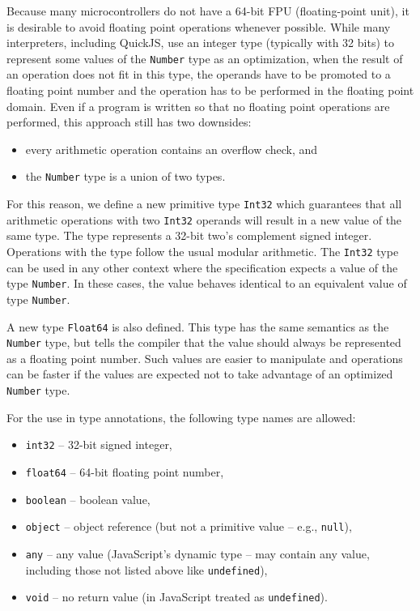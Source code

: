 Because many microcontrollers do not have a 64-bit FPU (floating-point unit), it is desirable to avoid floating point operations whenever possible. While many interpreters, including QuickJS, use an integer type (typically with 32 bits) to represent some values of the \texttt{Number} type as an optimization, when the result of an operation does not fit in this type, the operands have to be promoted to a floating point number and the operation has to be performed in the floating point domain. Even if a program is written so that no floating point operations are performed, this approach still has two downsides:
\begin{itemize}
    \item every arithmetic operation contains an overflow check, and
    \item the \texttt{Number} type is a union of two types.
\end{itemize}

For this reason, we define a new primitive type \texttt{Int32} which guarantees that all arithmetic operations with two \texttt{Int32} operands will result in a new value of the same type. The type represents a 32-bit two's complement signed integer. Operations with the type follow the usual modular arithmetic. The \texttt{Int32} type can be used in any other context where the specification expects a value of the type \texttt{Number}. In these cases, the value behaves identical to an equivalent value of type \texttt{Number}.

A new type \texttt{Float64} is also defined. This type has the same semantics as the \texttt{Number} type, but tells the compiler that the value should always be represented as a floating point number. Such values are easier to manipulate and operations can be faster if the values are expected not to take advantage of an optimized \texttt{Number} type.

For the use in type annotations, the following type names are allowed:
\begin{itemize}
    \item \texttt{int32} -- 32-bit signed integer,
    \item \texttt{float64} -- 64-bit floating point number,
    \item \texttt{boolean} -- boolean value,
    \item \texttt{object} -- object reference (but not a primitive value -- e.g., \texttt{null}),
    \item \texttt{any} -- any value (JavaScript's dynamic type -- may contain any value, including those not listed above like \texttt{undefined}),
    \item \texttt{void} -- no return value (in JavaScript treated as \texttt{undefined}).
\end{itemize}

